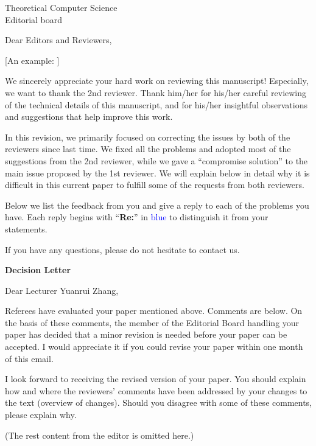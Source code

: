\documentclass[a4paper,10pt]{letter}
\newcommand{\editor}[1]{\hrulefill\par{\Large\textbf{#1}}}
\newcommand{\ins}[1]{\textcolor{blue}{#1}} %
\begin{document}
\begin{letter}{Theoretical Computer Science\\
    Editorial board}

\opening{Dear Editors and Reviewers,}

[An example: ]

We sincerely appreciate your hard work on reviewing this manuscript! Especially, we want to thank the 2nd reviewer. Thank him/her for his/her careful reviewing of the technical details of this manuscript, and for his/her insightful observations and suggestions that help improve this work.

In this revision, we primarily focused on correcting the issues by both of the reviewers since last time.
We fixed all the problems and adopted most of the suggestions from the 2nd reviewer, while we gave a ``compromise solution'' to the main issue proposed by the 1st reviewer.
We will explain below in detail why it is difficult in this current paper to fulfill some of the requests from both reviewers.


Below we list the feedback from you and give a reply to each of the problems you have.
Each reply begins with ``\textbf{Re:}'' in {\ins{blue}} to distinguish it from your statements.


If you have any questions, please do not hesitate to contact us.

\editor{Decision Letter}

Dear Lecturer Yuanrui Zhang,

Referees have evaluated your paper mentioned above. Comments are below. On the basis of these comments, the member of the Editorial Board handling your paper has decided that a minor revision is needed before your paper can be accepted. I would appreciate it if you could revise your paper within one month of this email.

I look forward to receiving the revised version of your paper. You should explain how and where the reviewers' comments have been addressed by your changes to the text (overview of changes). Should you disagree with some of these comments, please explain why.


(The rest content from the editor is omitted here.)


\end{letter}
\end{document}
